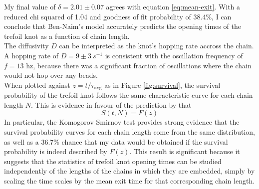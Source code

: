 \documentclass[11pt]{article}
\begin{document}
    My final value of $\delta=2.01\pm 0.07$ agrees with equation \ref{eq:mean-exit}. With a reduced 
    chi squared of 1.04 and goodness of fit probability of 38.4\%, I can conclude that Ben-Naim's 
    model accurately predicts the opening times of the trefoil knot as a function of chain length.\\
    
    The diffusivity $D$ can be interpreted as the knot's hopping rate accross the chain. A hopping rate of 
    $D= 9 \pm 3~\unit{s}^{-1}$ is consistent with the oscillation frequency of $f=13$ hz, because there 
    was a significant fraction of oscillations where the chain would not hop over any beads.\\

    When plotted against $z= t/\tau_{\text{avg}}$ as in Figure \ref{fig:survival}, the survival
    probability of the trefoil knot follows the same characteristic curve for each chain length
    $N$. This is evidence in favour of the prediction by \cite{BenNaim2001} that
    \[
        S(t,N) = F(z)
    \]
    In particular, the Komogorov Smirnov test provides strong evidence that the survival probability
    curves for each chain length come from the same distribution, as well as a 36.7\% chance that my data 
    would be obtained if the survival probability is indeed described by $F(z)$. This result is significant 
    because it suggests that the statistics of trefoil knot opening times can be studied independently 
    of the lengths of the chains in which they are embedded, simply by scaling the time scales by the 
    mean exit time for that corresponding chain length. 
\newpage    

\end{document}
